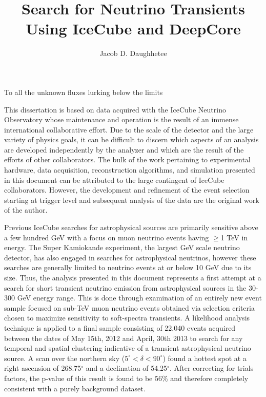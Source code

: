 \documentclass{gatech-thesis}
\title{Search for Neutrino Transients Using IceCube and DeepCore}
\author{Jacob D. Daughhetee}
\begin{document}

\begin{preliminary}

\begin{dedication}
\null\vfil
{\large
\begin{center}
To all the unknown fluxes lurking below the limits
\end{center}}
\vfil\null
\end{dedication}

\begin{preface}

	This dissertation is based on data acquired with the IceCube Neutrino Observatory whose maintenance and operation is the result of an immense international collaborative effort. Due to the scale of the detector and the large variety of physics goals, it can be difficult to discern which aspects of an analysis are developed independently by the analyzer and which are the result of the efforts of other collaborators. The bulk of the work pertaining to experimental hardware, data acquisition, reconstruction algorithms, and simulation presented in this document can be attributed to the large contingent of IceCube collaborators. However, the development and refinement of the event selection starting at trigger level and subsequent analysis of the data are the original work of the author.

	Previous IceCube searches for astrophysical sources are primarily sensitive above a few hundred GeV with a focus on muon neutrino events having $\geq$1 TeV in energy. The Super Kamiokande experiment, the largest GeV scale neutrino detector, has also engaged in searches for astrophysical neutrinos, however these searches are generally limited to neutrino events at or below 10 GeV due to its size. Thus, the analysis presented in this document represents a first attempt at a search for short transient neutrino emission from astrophysical sources in the 30-300 GeV energy range. This is done through examination of an entirely new event sample focused on sub-TeV muon neutrino events obtained via selection criteria chosen to maximize sensitivity to soft-spectra transients. A likelihood analysis technique is applied to a final sample consisting of 22,040 events acquired between the dates of May 15th, 2012 and April, 30th 2013 to search for any temporal and spatial clustering indicative of a transient astrophysical neutrino source. A scan over the northern sky ($5^{\circ} < \delta < 90^{\circ}$) found a hottest spot at a right ascension of 268.75$^{\circ}$ and a declination of 54.25$^{\circ}$. After correcting for trials factors, the p-value of this result is found to be 56$\%$ and therefore completely consistent with a purely background dataset.
	

\end{preface}
\end{preliminary}
\end{document}
